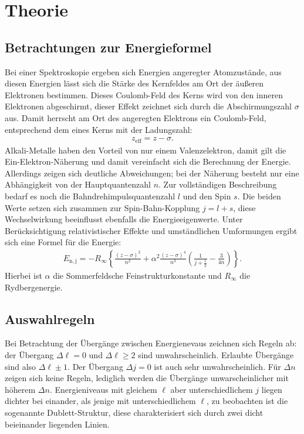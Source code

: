 \section{Theorie}
\label{sec:Theorie}
\subsection{Betrachtungen zur Energieformel}
Bei einer Spektroskopie ergeben sich Energien angeregter Atomzustände, aus diesen Energien lässt sich die Stärke
des Kernfeldes am Ort der äußeren Elektronen bestimmen. Dieses Coulomb-Feld des Kerns wird von den inneren Elektronen
abgeschirmt, dieser Effekt zeichnet sich durch die Abschirmungszahl $\sigma$ aus. Damit herrscht am Ort des angeregten Elektrons
ein Coulomb-Feld, entsprechend dem eines Kerns mit der Ladungszahl:
\begin{align}
  z_\mathrm{eff} = z-\sigma.
\end{align}
Alkali-Metalle haben den Vorteil von nur einem Valenzelektron, damit gilt die Ein-Elektron-Näherung und damit vereinfacht sich die Berechnung der Energie.
Allerdings zeigen sich deutliche Abweichungen; bei der Näherung besteht nur eine Abhängigkeit von der Hauptquantenzahl $n$.
Zur vollständigen Beschreibung bedarf es noch die Bahndrehimpulsquantenzahl $l$ und den Spin $s$. Die beiden Werte setzen sich zusammen
zur Spin-Bahn-Kopplung $j=l+s$, diese Wechselwirkung beeinflusst ebenfalls die Energieeigenwerte.
Unter Berücksichtigung relativistischer Effekte und umständlichen Umformungen ergibt sich eine Formel für die Energie:
\begin{align}
  E_\mathrm{n,j}=-R_\mathrm{\infty}\left\{\frac{(z-\sigma)^2}{n^2}+\alpha^2\frac{(z-\sigma)^4}{n^3}\left(\frac{1}{j+\frac{1}{2}}-\frac{3}{4n}\right)\right\}.\label{eqn:sf}
\end{align}
Hierbei ist $\alpha$ die Sommerfeldsche Feinstrukturkonstante und $R_\mathrm{\infty}$ die Rydbergenergie.

\subsection{Auswahlregeln}
Bei Betrachtung der Übergänge zwischen Energienevaus zeichnen sich Regeln ab:
der Übergang $\Delta\ell=0$ und $\Delta\ell\geq 2$ sind unwahrscheinlich.
Erlaubte Übergänge sind also $\Delta\ell\pm 1$.
Der Übergang $\Delta j=0$ ist auch sehr unwahrscheinlich.
Für $\Delta n$ zeigen sich keine Regeln, lediglich werden die Übergänge
unwarscheinlicher mit höherem $\Delta n$.
Energieniveaus mit gleichem $\ell$ aber unterschiedlichem $j$
liegen dichter bei einander, als jenige mit unterschiedlichem $\ell$, zu beobachten
ist die sogenannte Dublett-Struktur, diese charakterisiert sich durch zwei dicht beieinander liegenden Linien.

